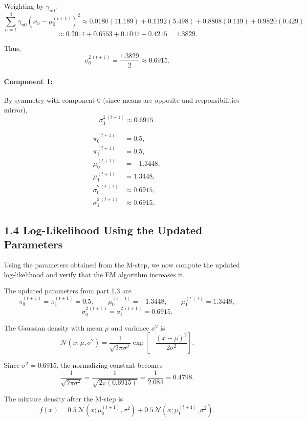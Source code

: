 \documentclass{article}
\begin{document}
Weighting by $\gamma_{n0}$:
\[
\sum_{n=1}^4 \gamma_{n0}(x_n - \mu_0^{(t+1)})^2
\approx 0.0180(11.189) + 0.1192(5.498) + 0.8808(0.119) + 0.9820(0.429)
\]
\[
\approx 0.2014 + 0.6553 + 0.1047 + 0.4215 = 1.3829.
\]

Thus,
\[
\sigma_0^{2\,(t+1)} = \frac{1.3829}{2} \approx 0.6915.
\]

\paragraph{Component 1:}
By symmetry with component 0 (since means are opposite and responsibilities mirror),
\[
\sigma_1^{2\,(t+1)} \approx 0.6915.
\]

\[
\boxed{
\begin{aligned}
\pi_0^{(t+1)} &= 0.5, \\
\pi_1^{(t+1)} &= 0.5, \\
\mu_0^{(t+1)} &= -1.3448, \\
\mu_1^{(t+1)} &= 1.3448, \\
\sigma_0^{2\,(t+1)} &\approx 0.6915, \\
\sigma_1^{2\,(t+1)} &\approx 0.6915.
\end{aligned}
}
\]

\subsection*{1.4 Log-Likelihood Using the Updated Parameters}

Using the parameters obtained from the M-step, we now compute the updated log-likelihood and verify that the EM algorithm increases it.

The updated parameters from part 1.3 are
\[
\pi_0^{(t+1)} = \pi_1^{(t+1)} = 0.5, \qquad
\mu_0^{(t+1)} = -1.3448, \qquad
\mu_1^{(t+1)} = 1.3448,
\]
\[
\sigma_0^{2\,(t+1)} = \sigma_1^{2\,(t+1)} = 0.6915.
\]

The Gaussian density with mean $\mu$ and variance $\sigma^2$ is
\[
\mathcal{N}(x;\mu,\sigma^2)
= \frac{1}{\sqrt{2\pi\sigma^2}}
  \exp\!\left[-\frac{(x-\mu)^2}{2\sigma^2}\right].
\]

Since $\sigma^2 = 0.6915$, the normalizing constant becomes
\[
\frac{1}{\sqrt{2\pi\sigma^2}}
= \frac{1}{\sqrt{2\pi(0.6915)}}
= \frac{1}{2.084}
= 0.4798.
\]

The mixture density after the M-step is
\[
f(x) = 0.5\,\mathcal{N}(x;\mu_0^{(t+1)},\sigma^2)
     + 0.5\,\mathcal{N}(x;\mu_1^{(t+1)},\sigma^2).
\]
\end{document}

